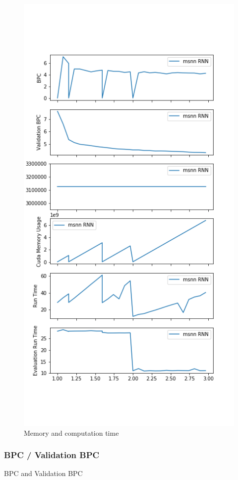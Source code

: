 \begin{figure}[h]
\centering
\includegraphics[height=.7\textheight]{parts/appendix/reports-gmsnn/docs_esteban-latex/test_reports/2018-06-11/frac.png}
\caption{Memory and computation time}
\end{figure}

\newpage
\subsubsection{BPC / Validation BPC}

BPC and Validation BPC

